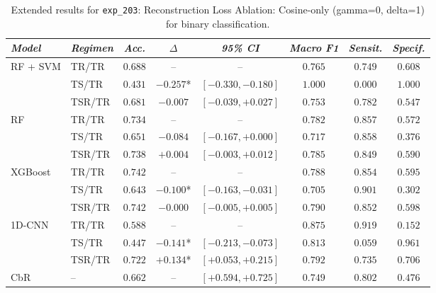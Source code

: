 \begin{table}[H]
\centering
\scriptsize
\caption{Extended results for \texttt{exp\_203}: Reconstruction Loss Ablation: Cosine-only (gamma=0, delta=1) for binary classification.}
\label{tab:appendix_exp_203}
\begin{tabular*}{\textwidth}{@{\extracolsep{\fill}}llcccccc}
\toprule
\emph{Model} & \emph{Regimen} & \emph{Acc.} & \emph{$\Delta$} & \emph{95\% CI} & \emph{Macro F1} & \emph{Sensit.} & \emph{Specif.}\\
\midrule
\multirow{3}{*}{RF + SVM} & TR/TR & $0.688$ & -- & -- & $0.765$ & $0.749$ & $0.608$\\
 & TS/TR & $0.431$ & $-0.257$* & $[-0.330, -0.180]$ & $1.000$ & $0.000$ & $1.000$\\
 & TSR/TR & $0.681$ & $-0.007$ & $[-0.039, +0.027]$ & $0.753$ & $0.782$ & $0.547$\\
\midrule
\multirow{3}{*}{RF} & TR/TR & $0.734$ & -- & -- & $0.782$ & $0.857$ & $0.572$\\
 & TS/TR & $0.651$ & $-0.084$ & $[-0.167, +0.000]$ & $0.717$ & $0.858$ & $0.376$\\
 & TSR/TR & $0.738$ & $+0.004$ & $[-0.003, +0.012]$ & $0.785$ & $0.849$ & $0.590$\\
\midrule
\multirow{3}{*}{XGBoost} & TR/TR & $0.742$ & -- & -- & $0.788$ & $0.854$ & $0.595$\\
 & TS/TR & $0.643$ & $-0.100$* & $[-0.163, -0.031]$ & $0.705$ & $0.901$ & $0.302$\\
 & TSR/TR & $0.742$ & $-0.000$ & $[-0.005, +0.005]$ & $0.790$ & $0.852$ & $0.598$\\
\midrule
\multirow{3}{*}{1D-CNN} & TR/TR & $0.588$ & -- & -- & $0.875$ & $0.919$ & $0.152$\\
 & TS/TR & $0.447$ & $-0.141$* & $[-0.213, -0.073]$ & $0.813$ & $0.059$ & $0.961$\\
 & TSR/TR & $0.722$ & $+0.134$* & $[+0.053, +0.215]$ & $0.792$ & $0.735$ & $0.706$\\
\midrule
CbR & -- & $0.662$ & -- & $[+0.594, +0.725]$ & $0.749$ & $0.802$ & $0.476$\\
\bottomrule
\end{tabular*}
\end{table}

